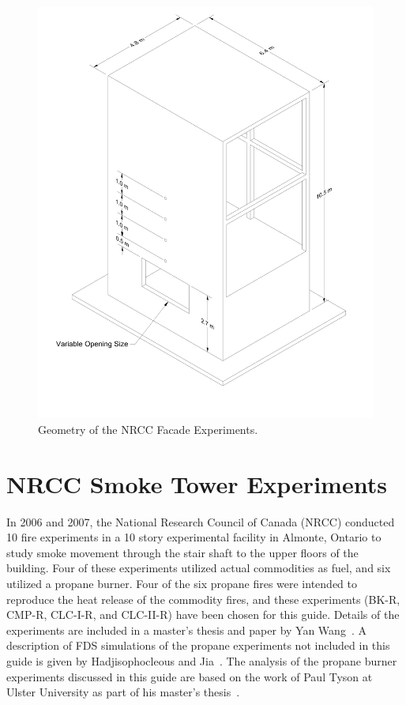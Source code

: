 \begin{figure}[!ht]
\centering
\includegraphics[width=5in]{FIGURES/NRCC_Facade/NRCC_Facade}
\caption[Geometry of the NRCC Facade Experiments]{Geometry of the NRCC Facade Experiments.}
\label{NRCC_Facade_Drawing}
\end{figure}


\section{NRCC Smoke Tower Experiments}
\label{NRCC_Smoke_Tower_Description}

In 2006 and 2007, the National Research Council of Canada (NRCC) conducted 10 fire experiments in a 10 story experimental facility in Almonte, Ontario to study smoke movement through the stair shaft to the upper floors of the building. Four of these experiments utilized actual commodities as fuel, and six utilized a propane burner. Four of the six propane fires were intended to reproduce the heat release of the commodity fires, and these experiments (BK-R, CMP-R, CLC-I-R, and CLC-II-R) have been chosen for this guide. Details of the experiments are included in a master's thesis and paper by Yan Wang~\cite{Wang:Thesis,Wang:FT2011}. A description of FDS simulations of the propane experiments not included in this guide is given by Hadjisophocleous and Jia~\cite{Hadjisophocleous:FT2009}. The analysis of the propane burner experiments discussed in this guide are based on the work of Paul Tyson at Ulster University as part of his master's thesis~\cite{Tyson:Thesis}.


